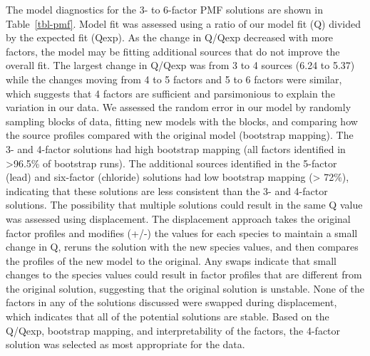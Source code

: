 \documentclass[
  letterpaper,
  DIV=11,
  numbers=noendperiod]{scrartcl}
\begin{document}
The model diagnostics for the 3- to 6-factor PMF
solutions are shown in Table~\ref{tbl-pmf}. Model fit was assessed using
a ratio of our model fit (Q) divided by the expected fit (Qexp). As the
change in Q/Qexp decreased with more factors, the model may be fitting
additional sources that do not improve the overall fit. The largest
change in Q/Qexp was from 3 to 4 sources (6.24 to 5.37) while the
changes moving from 4 to 5 factors and 5 to 6 factors were similar,
which suggests that 4 factors are sufficient and parsimonious to explain
the variation in our data. We assessed the random error in our model by
randomly sampling blocks of data, fitting new models with the blocks,
and comparing how the source profiles compared with the original model
(bootstrap mapping). The 3- and 4-factor solutions had high bootstrap
mapping (all factors identified in \textgreater96.5\% of bootstrap
runs). The additional sources identified in the 5-factor (lead) and
six-factor (chloride) solutions had low bootstrap mapping
(\textgreater{} 72\%), indicating that these solutions are less
consistent than the 3- and 4-factor solutions. The possibility that
multiple solutions could result in the same Q value was assessed using
displacement. The displacement approach takes the original factor
profiles and modifies (+/-) the values for each species to maintain a
small change in Q, reruns the solution with the new species values, and
then compares the profiles of the new model to the original. Any swaps
indicate that small changes to the species values could result in factor
profiles that are different from the original solution, suggesting that
the original solution is unstable. None of the factors in any of the
solutions discussed were swapped during displacement, which indicates
that all of the potential solutions are stable. Based on the Q/Qexp,
bootstrap mapping, and interpretability of the factors, the 4-factor
solution was selected as most appropriate for the data.
\end{document}
